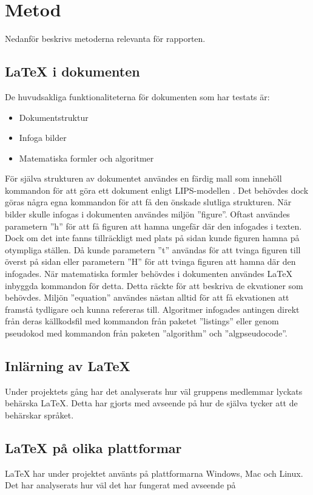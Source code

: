 \section{Metod}  
Nedanför beskrivs metoderna relevanta för rapporten.  

\subsection{{\LaTeX} i dokumenten}
De huvudsakliga funktionaliteterna för dokumenten som har testats är: 
\begin{itemize}
\item Dokumentstruktur
\item Infoga bilder
\item Matematiska formler och algoritmer
\end{itemize}   
För själva strukturen av dokumentet användes en färdig mall som innehöll kommandon för att göra ett dokument enligt LIPS-modellen \citep{lips}. Det behövdes dock göras några egna kommandon för att få den önskade slutliga strukturen.
\newline
\newline
När bilder skulle infogas i dokumenten användes miljön ''figure''. Oftast användes parametern ''h'' för att få figuren att hamna ungefär där den infogades i texten. Dock om det inte fanns tillräckligt med plats på sidan kunde figuren hamna på otympliga ställen. Då kunde parametern ''t'' användas för att tvinga figuren till överst på sidan eller parametern ''H'' för att tvinga figuren att hamna där den infogades.   
\newline
\newline
När matematiska formler behövdes i dokumenten användes {\LaTeX} inbyggda kommandon för detta. Detta räckte för att beskriva de ekvationer som behövdes. Miljön ''equation'' användes nästan alltid för att få ekvationen att framstå tydligare och kunna refereras till. Algoritmer infogades antingen direkt från deras källkodsfil med kommandon från paketet ''listings'' eller genom pseudokod med kommandon från paketen ''algorithm'' och ''algpseudocode''.  
     
\subsection{Inlärning av {\LaTeX}}
Under projektets gång har det analyserats hur väl gruppens medlemmar lyckats behärska {\LaTeX}. Detta har gjorts med avseende på hur de själva tycker att de behärskar språket.     

\subsection{{\LaTeX} på olika plattformar}
{\LaTeX} har under projektet använts på plattformarna Windows, Mac och Linux. Det har analyserats hur väl det har fungerat med avseende på  
